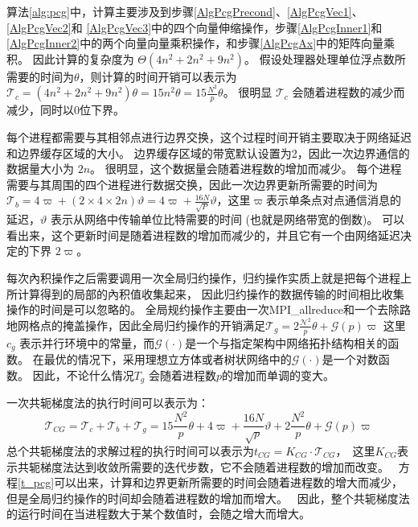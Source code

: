 算法\ref{alg:pcg}中，计算主要涉及到步骤\ref{AlgPcgPrecond}、\ref{AlgPcgVec1}、\ref{AlgPcgVec2}和 \ref{AlgPcgVec3}中的四个向量伸缩操作，步骤\ref{AlgPcgInner1}和\ref{AlgPcgInner2}中的两个向量向量乘积操作，和步骤\ref{AlgPcgAx}中的矩阵向量乘积。 
因此计算的复杂度为 $\Theta (4 n^2 +2n^2+ 9n^2)$。 
假设处理器处理单位浮点数所需要的时间为$\theta$，则计算的时间开销可以表示为
$\mathcal{T}_c=  (4 n^2 +2n^2+ 9n^2)\theta = 15n^2\theta  = 15\frac{N^2}{p}\theta $。 
很明显 $\mathcal{T}_c$ 会随着进程数的减少而减少，同时以0位下界。 


每个进程都需要与其相邻点进行边界交换，这个过程时间开销主要取决于网络延迟和边界缓存区域的大小。 
边界缓存区域的带宽默认设置为2，因此一次边界通信的数据量大小为 $2n$。 
很明显，这个数据量会随着进程数的增加而减少。 
每个进程需要与其周围的四个进程进行数据交换，因此一次边界更新所需要的时间为$\mathcal{T}_b =4\varpi + (2\times4\times 2n)\vartheta=4\varpi + \frac{16N}{\sqrt{P}}\vartheta$，这里$\varpi$表示单条点对点通信消息的延迟，$\vartheta$ 表示从网络中传输单位比特需要的时间 (也就是网络带宽的倒数)。 
可以看出来，这个更新时间是随着进程数的增加而减少的，并且它有一个由网络延迟决定的下界 $2\varpi$。



每次內积操作之后需要调用一次全局归约操作，归约操作实质上就是把每个进程上所计算得到的局部的內积值收集起来，
因此归约操作的数据传输的时间相比收集操作的时间是可以忽略的。 
全局规约操作主要由一次MPI\_allreduce和一个去除路地网格点的掩盖操作，因此全局归约操作的开销满足$\mathcal{T}_g= 2\frac{\mathcal{N}^2}{p}\theta + \mathcal{G}(p)\varpi$  
这里$c_g$ 表示并行环境中的常量，而$\mathcal{G}(\cdot)$是一个与指定架构中网络拓扑结构相关的函数。 
在最优的情况下，采用理想立方体或者树状网络中的$\mathcal{G}(\cdot)$是一个对数函数。 
因此，不论什么情况$T_g$ 会随着进程数$p$的增加而单调的变大。 
 
一次共轭梯度法的执行时间可以表示为：
\begin{equation}
\label{t_pcg}
\mathcal{T}_{CG} = \mathcal{T}_c + \mathcal{T}_b + \mathcal{T}_g
= 15\frac{N^2}{p}\theta + 4\varpi + \frac{16N}{\sqrt{p}}\vartheta+2\frac{N^2}{p}\theta + \mathcal{G}(p)\varpi
\end{equation}
总个共轭梯度法的求解过程的执行时间可以表示为$t_{CG} = K_{CG}\cdot \mathcal{T}_{CG}$，　这里$K_{CG}$表示共轭梯度法达到收敛所需要的迭代步数，它不会随着进程数的增加而改变。　
方程\ref{t_pcg}可以出来，计算和边界更新所需要的时间会随着进程数的增大而减少，但是全局归约操作的时间却会随着进程数的增加而增大。　
因此，整个共轭梯度法的运行时间在当进程数大于某个数值时，会随之增大而增大。　


